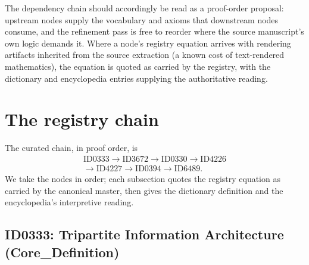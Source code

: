 \documentclass[11pt]{article}
\theoremstyle{remark}
\begin{document}
The dependency chain should accordingly be read as a proof-order proposal: upstream nodes supply the vocabulary and axioms that downstream nodes consume, and the refinement pass is free to reorder where the source manuscript's own logic demands it. Where a node's registry equation arrives with rendering artifacts inherited from the source extraction (a known cost of text-rendered mathematics), the equation is quoted as carried by the registry, with the dictionary and encyclopedia entries supplying the authoritative reading.

\section{The registry chain}
\label{sec:chain}

The curated chain, in proof order, is
\begin{equation*}
\begin{gathered}
\text{ID0333} \to \text{ID3672} \to \text{ID0330} \to \text{ID4226} \\
\to \text{ID4227} \to \text{ID0394} \to \text{ID6489}.
\end{gathered}
\end{equation*}
We take the nodes in order; each subsection quotes the registry equation as carried by the canonical master, then gives the dictionary definition and the encyclopedia's interpretive reading.

\subsection{ID0333: Tripartite Information Architecture (Core\_Definition)}
\end{document}
